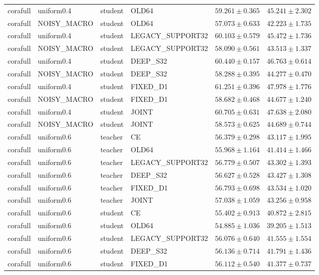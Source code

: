 \begin{longtable}{llllrr}
corafull & uniform0.4 & student & OLD64 & $59.261 \pm 0.365$ & $45.241 \pm 2.302$ \\
corafull & NOISY\_MACRO & student & OLD64 & $57.073 \pm 0.633$ & $42.223 \pm 1.735$ \\
corafull & uniform0.4 & student & LEGACY\_SUPPORT32 & $60.103 \pm 0.579$ & $45.472 \pm 1.736$ \\
corafull & NOISY\_MACRO & student & LEGACY\_SUPPORT32 & $58.090 \pm 0.561$ & $43.513 \pm 1.337$ \\
corafull & uniform0.4 & student & DEEP\_S32 & $60.440 \pm 0.157$ & $46.763 \pm 0.614$ \\
corafull & NOISY\_MACRO & student & DEEP\_S32 & $58.288 \pm 0.395$ & $44.277 \pm 0.470$ \\
corafull & uniform0.4 & student & FIXED\_D1 & $61.251 \pm 0.396$ & $47.978 \pm 1.776$ \\
corafull & NOISY\_MACRO & student & FIXED\_D1 & $58.682 \pm 0.468$ & $44.677 \pm 1.240$ \\
corafull & uniform0.4 & student & JOINT & $60.705 \pm 0.631$ & $47.638 \pm 2.080$ \\
corafull & NOISY\_MACRO & student & JOINT & $58.573 \pm 0.625$ & $44.689 \pm 0.744$ \\
corafull & uniform0.6 & teacher & CE & $56.379 \pm 0.298$ & $43.117 \pm 1.995$ \\
corafull & uniform0.6 & teacher & OLD64 & $55.968 \pm 1.164$ & $41.414 \pm 1.466$ \\
corafull & uniform0.6 & teacher & LEGACY\_SUPPORT32 & $56.779 \pm 0.507$ & $43.302 \pm 1.393$ \\
corafull & uniform0.6 & teacher & DEEP\_S32 & $56.627 \pm 0.528$ & $43.427 \pm 1.308$ \\
corafull & uniform0.6 & teacher & FIXED\_D1 & $56.793 \pm 0.698$ & $43.534 \pm 1.020$ \\
corafull & uniform0.6 & teacher & JOINT & $57.038 \pm 1.059$ & $43.256 \pm 0.958$ \\
corafull & uniform0.6 & student & CE & $55.402 \pm 0.913$ & $40.872 \pm 2.815$ \\
corafull & uniform0.6 & student & OLD64 & $54.885 \pm 1.036$ & $39.205 \pm 1.513$ \\
corafull & uniform0.6 & student & LEGACY\_SUPPORT32 & $56.076 \pm 0.640$ & $41.555 \pm 1.554$ \\
corafull & uniform0.6 & student & DEEP\_S32 & $56.136 \pm 0.714$ & $41.791 \pm 1.436$ \\
corafull & uniform0.6 & student & FIXED\_D1 & $56.112 \pm 0.540$ & $41.377 \pm 0.737$ \\

\end{longtable}
